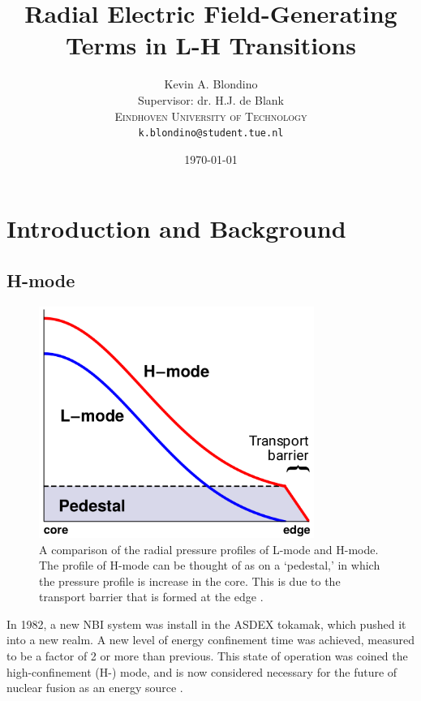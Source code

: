 \documentclass[a4paper]{article}
\title{Radial Electric Field-Generating Terms in L-H Transitions}
\author{{\Large Kevin A. Blondino} \\
	Supervisor: dr. H.J. de Blank \\
	\textsc{Eindhoven University of Technology} \\
	\texttt{k.blondino@student.tue.nl}}
\date{\today}
\begin{document}
\maketitle


\begin{abstract}
	
\end{abstract}

\section{Introduction and Background}
\subsection{H-mode}
\begin{figure}[b]
\begin{minipage}{0.48\linewidth}
	\centering
	\includegraphics[width=0.8\textwidth]{../../Graphics/L-mode_H-mode_compare.png}
\end{minipage}
\hfill
\begin{minipage}{0.48\linewidth}
	\caption{A comparison of the radial pressure profiles of L-mode and H-mode.
	The profile of H-mode can be thought of as on a `pedestal,' in which the pressure profile is increase in the core.
	This is due to the transport barrier that is formed at the edge \cite{weymiens_bifurcation_2014}.}
	\label{fig:L-mode_H-mode_compare}
\end{minipage}
\end{figure}

In 1982, a new NBI system was install in the ASDEX tokamak, which pushed it into a new realm.
A new level of energy confinement time was achieved, measured to be a factor of 2 or more than previous.
This state of operation was coined the high-confinement (H-) mode, and is now considered necessary for the future of nuclear fusion as an energy source \cite{arnoux_how_2009} \cite{wagner_development_1984}.
\end{document}
